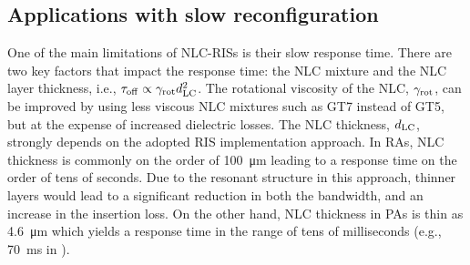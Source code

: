 
\subsection{Applications with slow reconfiguration}

One of the main limitations of \gls{NLC}-\glspl{RIS} is their slow response time.  There are two key factors that impact the response time: the \gls{NLC} mixture and the \gls{NLC} layer thickness, i.e., $\tau_{\rm off} \propto \gamma_{\rm rot} d_{\rm LC}^2$.
The rotational viscosity of the \gls{NLC}, $\gamma_{\rm rot}$, can be improved by using less viscous \gls{NLC} mixtures such as GT7 instead of GT5, but at the expense of increased dielectric losses. 
The \gls{NLC} thickness, $d_{\rm LC}$, strongly depends on the adopted \gls{RIS} implementation approach. 
In \glspl{RA}, \gls{NLC} thickness is commonly on the order of \SI{100}{\micro\meter} leading to a response time on the order of tens of seconds. 
Due to the resonant structure in this approach, thinner layers would lead to a significant reduction in both the bandwidth, and an increase in the insertion loss. 
On the other hand, \gls{NLC} thickness in \glspl{PA} is thin as \SI{4.6}{\micro\meter} which yields a response time in the range of tens of milliseconds (e.g., \SI{70}{\milli\second} in \cite{neuder2023compact}). 

